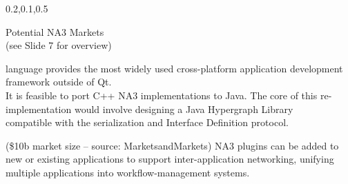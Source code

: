 \begin{frame}{}
{\begin{center}
\begin{minipage}{\textwidth}
{\begin{minipage}{\textwidth}
\begin{lightquadblockc}{0.2,0.1,0.5}{\parbox{21cm}{\vspace*{10pt}\centering Potential NA3 Markets \\(see Slide 7 for overview)\vspace*{10pt}}}
\begin{minipage}{1.08\textwidth}
{\begin{description}
language provides the most widely used cross-platform 
application development framework outside of Qt.  
\\It is feasible to port C++ NA3 implementations 
to Java.  The core of this re-implementation would 
involve designing a Java Hypergraph Library \\compatible 
with the \AtR{} serialization and Interface Definition 
protocol.\vspace{10pt}
\item[Workflow Management] 
({\texttildelow}\$10b market size -- 
source: 
{\selectfont MarketsandMarkets}) 
NA3 plugins can be added to new or existing 
applications to support inter-application 
networking, unifying multiple applications into workflow-management systems.
\vspace{.75em}  
\end{description}}\end{minipage}
\end{lightquadblockc}
\end{minipage}}


\end{minipage}
\end{center}
}

\end{frame}
